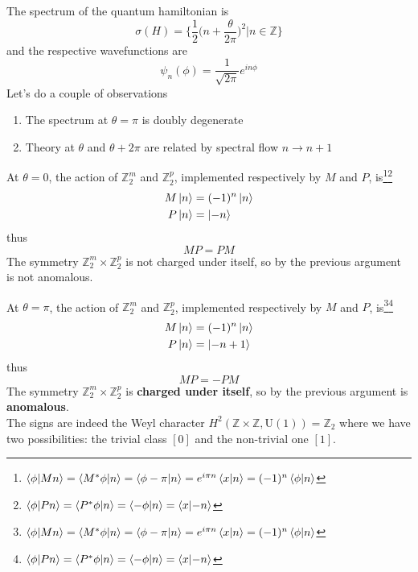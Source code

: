 \documentclass[11pt]{article}
\theoremstyle{definition}
\numberwithin{equation}{section}
\newcommand*\bbZ{\mathbb{Z}}
\newcommand*\U{\mathrm{U}}
\begin{document}
 The spectrum of the quantum hamiltonian is
    \begin{equation}
     \sigma(H) = \bigg\{ \frac{1}{2} \bigg(n + \frac{\theta}{2 \pi}\bigg)^2 \bigg| n \in \mathbb{Z}\bigg\}
 \end{equation}
 and the respective wavefunctions are
\begin{equation}
    \psi_n(\phi) = \frac{1}{\sqrt{2\pi}} e^{i n \phi}
\end{equation}
Let's do a couple of observations
\begin{enumerate}
    \item The spectrum at $\theta = \pi$ is doubly degenerate
    \item Theory at $\theta$ and $\theta + 2\pi$ are related by spectral flow $n \to n+1$
\end{enumerate}
At $\theta=0$, the action of $\mathbb{Z}_2^m$ and $\mathbb{Z}_2^p$, implemented respectively by $M$ and $P$, is\footnote{$\braket{\phi}{M n} = \braket{M^* \phi}{n} = \braket{\phi - \pi}{n} = e^{i \pi n}\braket{x}{n} = (-1)^n \braket{\phi}{n}$}\footnote{$\braket{\phi}{P n} = \braket{P^* \phi}{n} = \braket{-\phi}{n} =  \braket{x}{-n}$}
\begin{equation}
    \begin{aligned}
        M \ket{n} &= (-1)^n \ket{n}\\
        P \ket{n} &= \ket{-n}
    \end{aligned}
\end{equation}
thus
\begin{equation}
      MP = PM
\end{equation}  
The symmetry $\mathbb{Z}_2^m \times \mathbb{Z}_2^p$ is not charged under itself, so by the previous argument is not anomalous.
 
At $\theta=\pi$, the action of $\mathbb{Z}_2^m$ and $\mathbb{Z}_2^p$, implemented respectively by $M$ and $P$, is\footnote{$\braket{\phi}{M n} = \braket{M^* \phi}{n} = \braket{\phi - \pi}{n} = e^{i \pi n}\braket{x}{n} = (-1)^n \braket{\phi}{n}$}\footnote{$\braket{\phi}{P n} = \braket{P^* \phi}{n} = \braket{-\phi}{n} =  \braket{x}{-n}$}
\begin{equation}
    \begin{aligned}
        M \ket{n} &= (-1)^n \ket{n}\\
        P \ket{n} &= \ket{-n+1}
    \end{aligned}
\end{equation}
thus
\begin{equation}
      MP = - PM
\end{equation}  
The symmetry $\mathbb{Z}_2^m \times \mathbb{Z}_2^p$ is \textbf{charged under itself}, so by the previous argument is \textbf{anomalous}.\\
The signs are indeed the Weyl character $H^{2}(\bbZ\times\bbZ,\U(1))=\bbZ_{2}$ where we have two possibilities: the trivial class $[0]$ and the non-trivial one $[1]$.
\end{document}
